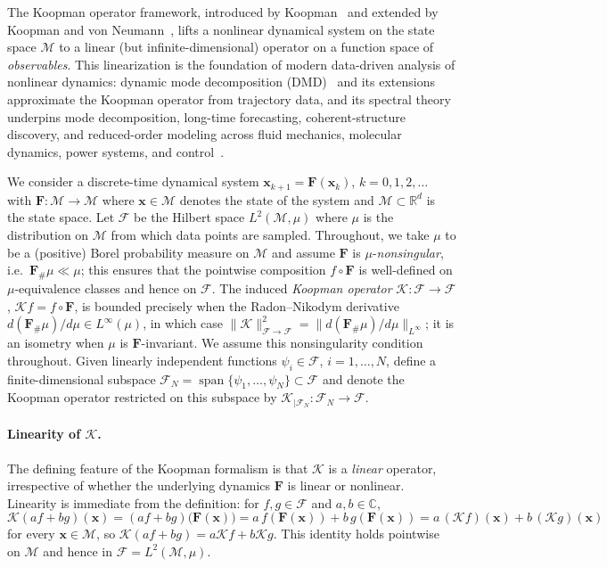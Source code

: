 \documentclass{article}
\theoremstyle{plain}
\theoremstyle{definition}
\DeclareMathOperator{\Span}{span}
\def\R{\mathbb{R}}
\def\x{\mathbf{x}}
\def\Koop{\mathcal{K}}
\def\Fc{\mathcal{F}}
\def\Mc{\mathcal{M}}
\newcommand{\arXivtag}[1][]{#1}
\begin{document}
The Koopman operator framework, introduced by Koopman~\cite{koopman1931hamiltonian} and extended by Koopman and von Neumann~\cite{Koopman-Neumann1932}, lifts a nonlinear dynamical system on the state space $\Mc$ to a linear (but infinite-dimensional) operator on a function space of \emph{observables}. This linearization is the foundation of modern data-driven analysis of nonlinear dynamics: dynamic mode decomposition (DMD)~\cite{schmid2010dynamic,rowley2009spectral,kutz2016dynamic} and its extensions~\cite{williams2015data,Klus2016JCompDyn,kevrekidis2016kernel} approximate the Koopman operator from trajectory data, and its spectral theory underpins mode decomposition, long-time forecasting, coherent-structure discovery, and reduced-order modeling across fluid mechanics, molecular dynamics, power systems, and control~\cite{Mezic2013AnnRevFluid,otto2021koopman,mezic2021koopman,colbrook2024beyond}.

We consider a discrete-time dynamical system
$\x_{k+1} = \mathbf{F}(\x_k)$, $k=0,1,2, \ldots$
with $\mathbf{F}:\Mc \to \Mc$ where $\x \in \Mc$ denotes the state of the system and $\Mc \subset \R^d$ is the state space. 
Let $\Fc$ be the Hilbert space $L^2(\Mc, \mu)$ where $\mu$ is the distribution on $\Mc$ from which data points are sampled. Throughout, we take $\mu$ to be a (positive) Borel probability measure on $\Mc$ and assume $\mathbf{F}$ is $\mu$-\emph{nonsingular}, i.e.\ $\mathbf{F}_{\#}\mu \ll \mu$; this ensures that the pointwise composition $f\circ\mathbf{F}$ is well-defined on $\mu$-equivalence classes and hence on $\Fc$. The induced \emph{Koopman operator} $\Koop:\Fc\to\Fc$, $\Koop f = f\circ\mathbf{F}$, is bounded precisely when the Radon--Nikodym derivative $d(\mathbf{F}_{\#}\mu)/d\mu \in L^\infty(\mu)$, in which case $\|\Koop\|_{\Fc\to\Fc}^2 = \|d(\mathbf{F}_{\#}\mu)/d\mu\|_{L^\infty}$; it is an isometry when $\mu$ is $\mathbf{F}$-invariant. We assume this \arXivtag[nonsingularity] condition throughout. Given linearly independent functions $\psi_i \in \Fc$, $i=1,\ldots, N$, define a finite-dimensional subspace $\Fc_N = \Span\{\psi_1, \ldots, \psi_N\} \subset \Fc$ and denote the Koopman operator restricted on this subspace by $\Koop_{|\Fc_N}:\Fc_N \to \Fc$.

\paragraph{Linearity of $\Koop$.}
The defining feature of the Koopman formalism is that $\Koop$ is a \emph{linear} operator, irrespective of whether the underlying dynamics $\mathbf{F}$ is linear or nonlinear. Linearity is immediate from the definition: for $f,g\in\Fc$ and $a,b\in\mathbb{C}$,
\begin{equation}\label{eq:koopman-linearity}
	\Koop(af + bg)(\x) = (af + bg)\bigl(\mathbf{F}(\x)\bigr) = a\,f(\mathbf{F}(\x)) + b\,g(\mathbf{F}(\x)) = a\,(\Koop f)(\x) + b\,(\Koop g)(\x)
\end{equation}
for every $\x\in\Mc$, so $\Koop(af+bg) = a\Koop f + b\Koop g$. This identity holds pointwise on $\Mc$ and hence in $\Fc = L^2(\Mc,\mu)$. 
\end{document}

